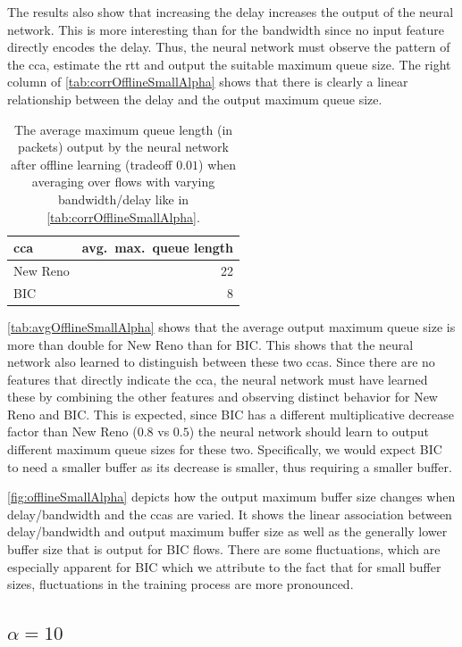 \documentclass[conference]{IEEEtran}
\begin{document}
The results also show that increasing the delay increases the output of the neural network. This is more interesting than for the bandwidth since no input feature directly encodes the delay. Thus, the neural network must observe the pattern of the \gls{cca}, estimate the \gls{rtt} and output the suitable maximum queue size. The right column of \autoref{tab:corrOfflineSmallAlpha} shows that there is clearly a linear relationship between the delay and the output maximum queue size. 

\begin{table}[h]
\caption{The average maximum queue length (in packets) output by the neural network after offline learning (tradeoff $0.01$) when averaging over flows with varying bandwidth/delay like in \autoref{tab:corrOfflineSmallAlpha}.} \label{tab:avgOfflineSmallAlpha}
\centering
\begin{tabular}{lr} \toprule
\gls{cca} & avg.~max.~queue length \\ \midrule
New Reno & 22 \\
BIC & 8 \\
\bottomrule
\end{tabular}
\end{table}

\autoref{tab:avgOfflineSmallAlpha} shows that the average output maximum queue size is more than double for New Reno than for BIC. This shows that the neural network also learned to distinguish between these two \glspl{cca}. Since there are no features that directly indicate the \gls{cca}, the neural network must have learned these by combining the other features and observing distinct behavior for New Reno and BIC. This is expected, since BIC has a different multiplicative decrease factor than New Reno ($0.8$ vs $0.5$) the neural network should learn to output different maximum queue sizes for these two. Specifically, we would expect BIC to need a smaller buffer as its decrease is smaller, thus requiring a smaller buffer. 

\autoref{fig:offlineSmallAlpha} depicts how the output maximum buffer size changes when delay/bandwidth and the \glspl{cca} are varied. It shows the linear association between delay/bandwidth and output maximum buffer size as well as the generally lower buffer size that is output for BIC flows. There are some fluctuations, which are especially apparent for BIC which we attribute to the fact that for small buffer sizes, fluctuations in the training process are more pronounced. 

\subsection{$\alpha=10$}
\end{document}
